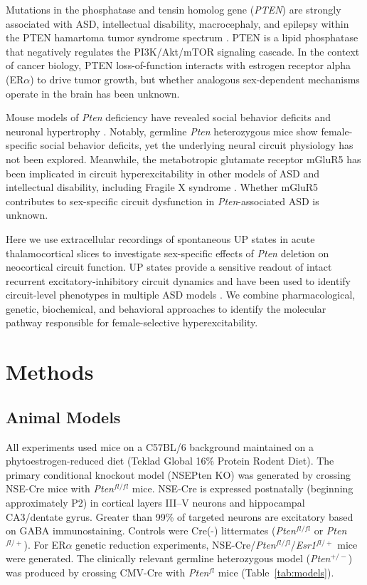 \documentclass[11pt]{article}
\begin{document}
Mutations in the phosphatase and tensin homolog gene (\textit{PTEN}) are strongly associated with ASD, intellectual disability, macrocephaly, and epilepsy within the PTEN hamartoma tumor syndrome spectrum \citep{butler2005}. PTEN is a lipid phosphatase that negatively regulates the PI3K/Akt/mTOR signaling cascade. In the context of cancer biology, PTEN loss-of-function interacts with estrogen receptor alpha (ER$\alpha$) to drive tumor growth, but whether analogous sex-dependent mechanisms operate in the brain has been unknown.

Mouse models of \textit{Pten} deficiency have revealed social behavior deficits and neuronal hypertrophy \citep{kwon2006, page2009}. Notably, germline \textit{Pten} heterozygous mice show female-specific social behavior deficits, yet the underlying neural circuit physiology has not been explored. Meanwhile, the metabotropic glutamate receptor mGluR5 has been implicated in circuit hyperexcitability in other models of ASD and intellectual disability, including Fragile X syndrome \citep{huber2002, hays2011}. Whether mGluR5 contributes to sex-specific circuit dysfunction in \textit{Pten}-associated ASD is unknown.

Here we use extracellular recordings of spontaneous UP states in acute thalamocortical slices to investigate sex-specific effects of \textit{Pten} deletion on neocortical circuit function. UP states provide a sensitive readout of intact recurrent excitatory-inhibitory circuit dynamics and have been used to identify circuit-level phenotypes in multiple ASD models \citep{gibson2008}. We combine pharmacological, genetic, biochemical, and behavioral approaches to identify the molecular pathway responsible for female-selective hyperexcitability.

\section{Methods}

\subsection{Animal Models}

All experiments used mice on a C57BL/6 background maintained on a phytoestrogen-reduced diet (Teklad Global 16\% Protein Rodent Diet). The primary conditional knockout model (NSEPten KO) was generated by crossing NSE-Cre mice with \textit{Pten}$^{fl/fl}$ mice. NSE-Cre is expressed postnatally (beginning approximately P2) in cortical layers III--V neurons and hippocampal CA3/dentate gyrus. Greater than 99\% of targeted neurons are excitatory based on GABA immunostaining. Controls were Cre(-) littermates (\textit{Pten}$^{fl/fl}$ or \textit{Pten}$^{fl/+}$). For ER$\alpha$ genetic reduction experiments, NSE-Cre/\textit{Pten}$^{fl/fl}$/\textit{Esr1}$^{fl/+}$ mice were generated. The clinically relevant germline heterozygous model (\textit{Pten}$^{+/-}$) was produced by crossing CMV-Cre with \textit{Pten}$^{fl}$ mice (Table~\ref{tab:models}).
\end{document}
